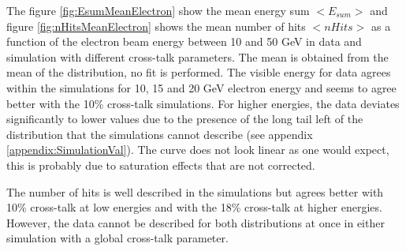 The figure \ref{fig:EsumMeanElectron} show the mean energy sum $<E_{sum}>$ and figure \ref{fig:nHitsMeanElectron} shows the mean number of hits $<nHits>$ as a function of the electron beam energy between 10 and 50 GeV in data and simulation with different cross-talk parameters. The mean is obtained from the mean of the distribution, no fit is performed. The visible energy for data agrees within the simulations for 10, 15 and 20 GeV electron energy and seems to agree better with the 10\% cross-talk simulations. For higher energies, the data deviates significantly to lower values due to the presence of the long tail left of the distribution that the simulations cannot describe (see appendix \ref{appendix:SimulationVal}). The curve does not look linear as one would expect, this is probably due to saturation effects that are not corrected.

The number of hits is well described in the simulations but agrees better with 10\% cross-talk at low energies and with the 18\% cross-talk at higher energies. However, the data cannot be described for both distributions at once in either simulation with a global cross-talk parameter.


